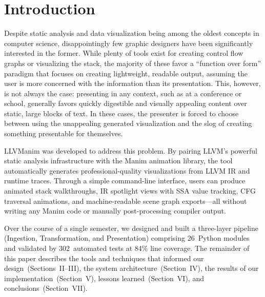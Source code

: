 \section{Introduction}
Despite static analysis and data visualization being among the oldest concepts in computer science, disappointingly few graphic designers have been significantly interested in the former. While plenty of tools exist for creating control flow graphs or visualizing the stack, the majority of these favor a ``function over form'' paradigm that focuses on creating lightweight, readable output, assuming the user is more concerned with the information than its presentation. This, however, is not always the case: presenting in any context, such as at a conference or school, generally favors quickly digestible and visually appealing content over static, large blocks of text. In these cases, the presenter is forced to choose between using the unappealing generated visualization and the slog of creating something presentable for themselves.

LLVManim was developed to address this problem. By pairing LLVM's powerful static analysis infrastructure with the Manim animation library, the tool automatically generates professional-quality visualizations from LLVM IR and runtime traces. Through a simple command-line interface, users can produce animated stack walkthroughs, IR spotlight views with SSA value tracking, CFG traversal animations, and machine-readable scene graph exports---all without writing any Manim code or manually post-processing compiler output.

Over the course of a single semester, we designed and built a three-layer pipeline (Ingestion, Transformation, and Presentation) comprising 26~Python modules and validated by 302~automated tests at 84\% line coverage. The remainder of this paper describes the tools and techniques that informed our design~(Sections~II--III), the system architecture~(Section~IV), the results of our implementation~(Section~V), lessons learned~(Section~VI), and conclusions~(Section~VII).
